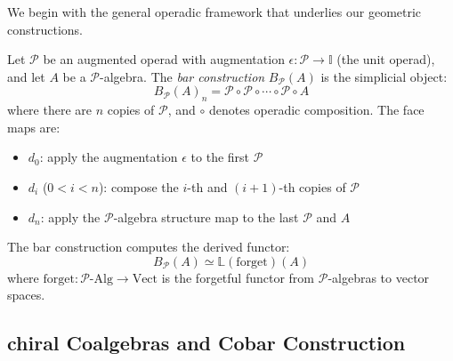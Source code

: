 We begin with the general operadic framework that underlies our geometric constructions.

\begin{definition}\label{def:bar-abstract}
Let $\mathcal{P}$ be an augmented operad with augmentation $\epsilon: \mathcal{P} \to \mathbb{I}$ (the unit operad), and let $A$ be a $\mathcal{P}$-algebra. The \emph{bar construction} $B_{\mathcal{P}}(A)$ is the simplicial object:
\[
B_{\mathcal{P}}(A)_n = \mathcal{P} \circ \mathcal{P} \circ \cdots \circ \mathcal{P} \circ A
\]
where there are $n$ copies of $\mathcal{P}$, and $\circ$ denotes operadic composition. The face maps are:
\begin{itemize}
\item $d_0$: apply the augmentation $\epsilon$ to the first $\mathcal{P}$
\item $d_i$ ($0 < i < n$): compose the $i$-th and $(i+1)$-th copies of $\mathcal{P}$
\item $d_n$: apply the $\mathcal{P}$-algebra structure map to the last $\mathcal{P}$ and $A$
\end{itemize}
\end{definition}

\begin{theorem}\label{thm:bar-derived}
The bar construction computes the derived functor:
\[
B_{\mathcal{P}}(A) \simeq \mathbb{L}(\text{forget}) (A)
\]
where $\text{forget}: \mathcal{P}\text{-Alg} \to \text{Vect}$ is the forgetful functor from $\mathcal{P}$-algebras to vector spaces.
\end{theorem}

\subsection{chiral Coalgebras and Cobar Construction}

